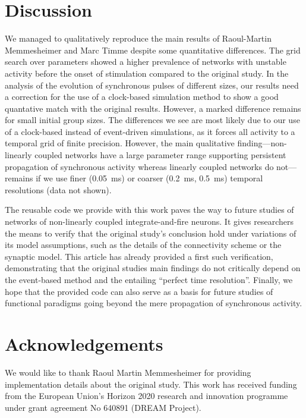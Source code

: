 \documentclass[10pt,a4paper,onecolumn]{article}
\begin{document}
\section*{Discussion}

We managed to qualitatively reproduce the main results of Raoul-Martin Memmes\-heimer and Marc Timme \cite{Memmesheimer2012} despite some quantitative differences. The grid search over parameters showed a higher prevalence of networks with unstable activity before the onset of stimulation compared to the original study. In the analysis of the evolution of synchronous pulses of different sizes, our results need a correction for the use of a clock-based simulation method to show a good quantative match with the original results. However, a marked difference remains for small initial group sizes. The differences we see are most likely due to our use of a clock-based instead of event-driven simulations, as it forces all activity to a temporal grid of finite precision. However, the main qualitative finding---non-linearly coupled networks have a large parameter range supporting persistent propagation of synchronous activity whereas linearly coupled networks do not---remains if we use finer (\SI{0.05}{\milli\second}) or coarser (\SI{0.2}{\milli\second}, \SI{0.5}{\milli\second}) temporal resolutions (data not shown).

The reusable code we provide with this work paves the way to future studies of networks of non-linearly coupled integrate-and-fire neurons. It gives researchers the means to verify that the original study's conclusion hold under variations of its model assumptions, such as the details of the connectivity scheme or the synaptic model. This article has already provided a first such verification, demonstrating that the original studies main findings do not critically depend on the event-based method and the entailing ``perfect time resolution''. Finally, we hope that the provided code can also serve as a basis for future studies of functional paradigms going beyond the mere propagation of synchronous activity.

\section*{Acknowledgements}
We would like to thank Raoul Martin Memmesheimer for providing implementation details about the original study. This work has received funding from the European Union’s Horizon 2020 research and innovation programme under grant agreement No 640891 (DREAM Project).
\end{document}
